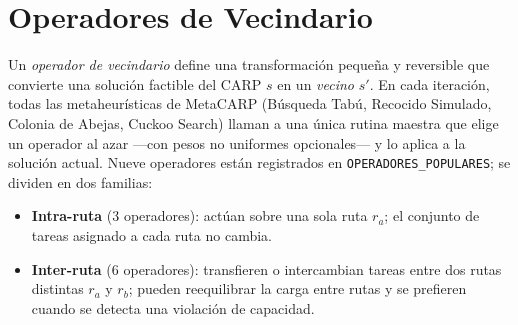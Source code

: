 %
%

\section{Operadores de Vecindario}
\label{sec:neighborhood-operators}

Un \emph{operador de vecindario} define una transformación pequeña y
reversible que convierte una solución factible del CARP $s$ en un
\emph{vecino} $s'$.
En cada iteración, todas las metaheurísticas de MetaCARP (Búsqueda Tabú,
Recocido Simulado, Colonia de Abejas, Cuckoo Search) llaman a una única
rutina maestra que elige un operador al azar ---con pesos no uniformes
opcionales--- y lo aplica a la solución actual.  Nueve operadores están
registrados en \texttt{OPERADORES\_POPULARES}; se dividen en dos familias:

\begin{itemize}
    \item \textbf{Intra-ruta} (3 operadores): actúan sobre una sola ruta
          $r_a$; el conjunto de tareas asignado a cada ruta no cambia.
    \item \textbf{Inter-ruta} (6 operadores): transfieren o intercambian
          tareas entre dos rutas distintas $r_a$ y $r_b$; pueden reequilibrar
          la carga entre rutas y se prefieren cuando se detecta una violación
          de capacidad.
\end{itemize}

